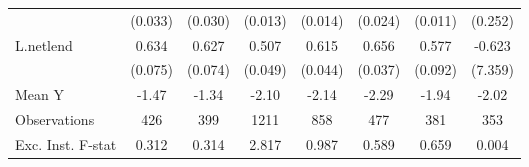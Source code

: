 {\begin{tabular}{l*{7}{c}}
            &     (0.033)         &     (0.030)         &     (0.013)         &     (0.014)         &     (0.024)         &     (0.011)         &     (0.252)         \\
\addlinespace
L.netlend   &       0.634\sym{***}&       0.627\sym{***}&       0.507\sym{***}&       0.615\sym{***}&       0.656\sym{***}&       0.577\sym{***}&      -0.623         \\
            &     (0.075)         &     (0.074)         &     (0.049)         &     (0.044)         &     (0.037)         &     (0.092)         &     (7.359)         \\
\midrule
Mean Y      &       -1.47         &       -1.34         &       -2.10         &       -2.14         &       -2.29         &       -1.94         &       -2.02         \\
Observations&         426         &         399         &        1211         &         858         &         477         &         381         &         353         \\
Exc. Inst. F-stat&       0.312         &       0.314         &       2.817         &       0.987         &       0.589         &       0.659         &       0.004         \\
\bottomrule
\end{tabular}
}
